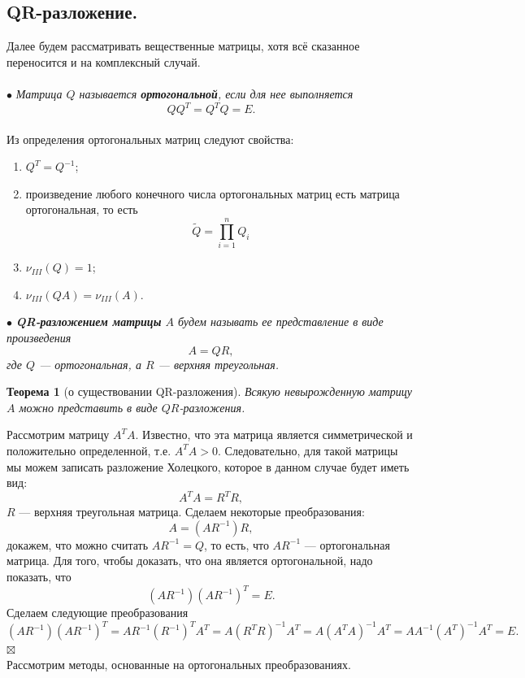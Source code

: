 \documentclass[a4paper, 12pt]{report}
\newenvironment{Proof} %
{\par\noindent{$\blacklozenge$}} %
{\hfill$\scriptstyle\boxtimes$}
\newtheorem*{theorem}{Теорема}
\begin{document}
	\subsection{QR-разложение.}
	Далее будем рассматривать вещественные матрицы, хотя всё сказанное переносится и на комплексный случай.\\\\
	$\bullet$ \textit{Матрица $Q$ называется \textbf{ортогональной}, если для нее выполняется $$QQ^T = Q^TQ = E.$$}\\
	Из определения ортогональных матриц следуют свойства:\begin{enumerate}
		\item $Q^T = Q^{-1}$;
		\item произведение любого конечного числа ортогональных матриц есть матрица ортогональная, то есть $$\widetilde{Q} = \prod\limits_{i=1}^n Q_i$$
		\item $\nu_{III}(Q) = 1$;
		\item $\nu_{III}(QA) = \nu_{III}(A)$.
	\end{enumerate}
	$\bullet$ \textit{\textbf{QR-разложением матрицы} $A$ будем называть ее представление в виде произведения} $$A = QR,$$ \textit{где $Q$ --- ортогональная, а $R$ --- верхняя треугольная.}
	\begin{theorem}
		[о существовании QR-разложения] Всякую невырожденную матрицу $A$ можно представить в виде $QR$-разложения.
	\end{theorem}
	\begin{Proof}
		Рассмотрим матрицу $A^TA$. Известно, что эта матрица является симметрической и положительно определенной, т.е. $A^TA>0$. Следовательно, для такой матрицы мы можем записать разложение Холецкого, которое в данном случае будет иметь вид:
		$$A^TA = R^TR,$$ $R$ --- верхняя треугольная матрица. Сделаем некоторые преобразования: 
		$$A = (AR^{-1})R,$$ докажем, что можно считать $AR^{-1} = Q$, то есть, что $AR^{-1}$ --- ортогональная матрица. Для того, чтобы доказать, что она является ортогональной, надо показать, что $$(AR^{-1})(AR^{-1})^T = E.$$
		Сделаем следующие преобразования 
		$$(AR^{-1})(AR^{-1})^T = AR^{-1} (R^{-1})^T A^T = A(R^TR)^{-1} A^T = A(A^TA)^{-1} A^T = AA^{-1}(A^T)^{-1}A^T= E.$$
	\end{Proof}\\
	Рассмотрим методы, основанные на ортогональных преобразованиях.
\end{document}
